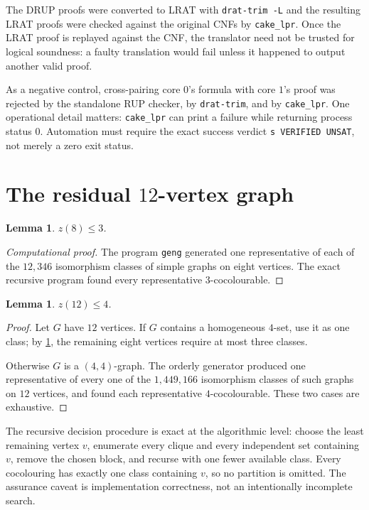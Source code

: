 \documentclass[11pt,a4paper]{article}
\newtheorem{lemma}[theorem]{Lemma}
\theoremstyle{definition}
\theoremstyle{remark}
\begin{document}
The DRUP proofs were converted to LRAT with \texttt{drat-trim -L} and the
resulting LRAT proofs were checked against the original CNFs by
\texttt{cake\_lpr}.  Once the LRAT proof is replayed against the CNF, the
translator need not be trusted for logical soundness: a faulty translation
would fail unless it happened to output another valid proof.

As a negative control, cross-pairing core \(0\)'s formula with core \(1\)'s
proof was rejected by the standalone RUP checker, by \texttt{drat-trim},
and by \texttt{cake\_lpr}.  One operational detail matters:
\texttt{cake\_lpr} can print a failure while returning process status \(0\).
Automation must require the exact success verdict
\texttt{s VERIFIED UNSAT}, not merely a zero exit status.

\section{\texorpdfstring{The residual \(12\)-vertex graph}{The residual 12-vertex graph}}

\begin{lemma}\label{lem:z8}
\(z(8)\leq3\).
\end{lemma}

\begin{proof}[Computational proof]
The program \texttt{geng} generated one representative of each of the
\(12{,}346\) isomorphism classes of simple graphs on eight vertices.
The exact recursive program  found every
representative \(3\)-cocolourable.
\end{proof}

\begin{lemma}\label{lem:z12}
\(z(12)\leq4\).
\end{lemma}

\begin{proof}
Let \(G\) have \(12\) vertices.  If \(G\) contains a homogeneous
\(4\)-set, use it as one class; by \cref{lem:z8}, the remaining eight
vertices require at most three classes.

Otherwise \(G\) is a \((4,4)\)-graph.  The orderly generator produced one
representative of every one of the \(1{,}449{,}166\) isomorphism classes
of such graphs on \(12\) vertices, and  found
each representative \(4\)-cocolourable.  These two cases are exhaustive.
\end{proof}

The recursive decision procedure is exact at the algorithmic level: choose
the least remaining vertex \(v\), enumerate every clique and every
independent set containing \(v\), remove the chosen block, and recurse with
one fewer available class.  Every cocolouring has exactly one class
containing \(v\), so no partition is omitted.  The assurance caveat is
implementation correctness, not an intentionally incomplete search.
\end{document}
